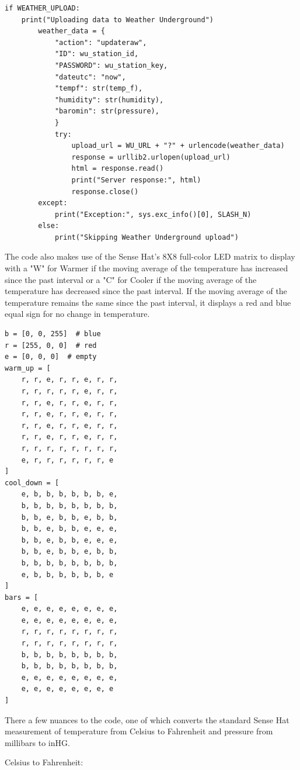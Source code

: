 \documentclass[sigconf]{acmart}
\begin{document}
\begin{verbatim}
if WEATHER_UPLOAD:
    print("Uploading data to Weather Underground")
        weather_data = {
            "action": "updateraw",
            "ID": wu_station_id,
            "PASSWORD": wu_station_key,
            "dateutc": "now",
            "tempf": str(temp_f),
            "humidity": str(humidity),
            "baromin": str(pressure),
            }
            try:
                upload_url = WU_URL + "?" + urlencode(weather_data)
                response = urllib2.urlopen(upload_url)
                html = response.read()
                print("Server response:", html)
                response.close()  
        except:
            print("Exception:", sys.exc_info()[0], SLASH_N)
        else:
            print("Skipping Weather Underground upload")
\end{verbatim}

The code also makes use of the Sense Hat's 8X8 full-color LED matrix to display with a "W" for Warmer if the moving average of the temperature has increased since the past interval or a "C" for Cooler if the moving average of the temperature has decreased since the past interval. If the moving average of the temperature remains the same since the past interval, it displays a red and blue equal sign for no change in temperature. 

\begin{verbatim}
b = [0, 0, 255]  # blue
r = [255, 0, 0]  # red
e = [0, 0, 0]  # empty
warm_up = [
    r, r, e, r, r, e, r, r,
    r, r, r, r, r, e, r, r,
    r, r, e, r, r, e, r, r,
    r, r, e, r, r, e, r, r,
    r, r, e, r, r, e, r, r,
    r, r, e, r, r, e, r, r,
    r, r, r, r, r, r, r, r,
    e, r, r, r, r, r, r, e
]
cool_down = [
    e, b, b, b, b, b, b, e,
    b, b, b, b, b, b, b, b,
    b, b, e, b, b, e, b, b,
    b, b, e, b, b, e, e, e,
    b, b, e, b, b, e, e, e,
    b, b, e, b, b, e, b, b,
    b, b, b, b, b, b, b, b,
    e, b, b, b, b, b, b, e
]
bars = [
    e, e, e, e, e, e, e, e,
    e, e, e, e, e, e, e, e,
    r, r, r, r, r, r, r, r,
    r, r, r, r, r, r, r, r,
    b, b, b, b, b, b, b, b,
    b, b, b, b, b, b, b, b,
    e, e, e, e, e, e, e, e,
    e, e, e, e, e, e, e, e
]
\end{verbatim}


There a few nuances to the code, one of which converts the standard Sense Hat measurement of temperature from Celsius to Fahrenheit and pressure from millibars to inHG. 

Celsius to Fahrenheit:
\end{document}
